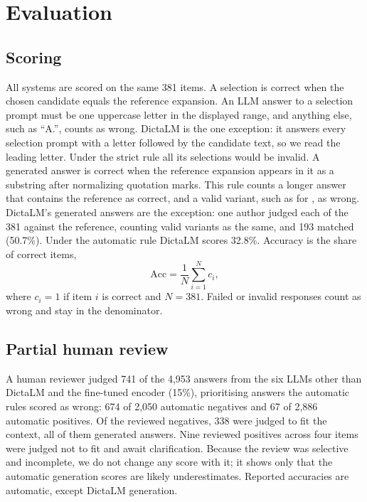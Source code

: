 \documentclass[11pt]{article}
\newcommand{\heb}[1]{\R{#1}}
\begin{document}
\section{Evaluation}
\label{sec:eval}
\subsection{Scoring}
All systems are scored on the same 381 items. A selection is correct when the chosen candidate equals the reference expansion. An LLM answer to a selection prompt must be one uppercase letter in the displayed range, and anything else, such as ``A.'', counts as wrong. DictaLM is the one exception: it answers every selection prompt with a letter followed by the candidate text, so we read the leading letter. Under the strict rule all its selections would be invalid. A generated answer is correct when the reference expansion appears in it as a substring after normalizing quotation marks. This rule counts a longer answer that contains the reference as correct, and a valid variant, such as \heb{שקלים חדשים} for \heb{שקל חדש}, as wrong. DictaLM's generated answers are the exception: one author judged each of the 381 against the reference, counting valid variants as the same, and 193 matched (50.7\%). Under the automatic rule DictaLM scores 32.8\%. Accuracy is the share of correct items,
\begin{equation}
\mathrm{Acc}=\frac{1}{N}\sum_{i=1}^{N}c_i,
\end{equation}
where $c_i=1$ if item $i$ is correct and $N=381$. Failed or invalid responses count as wrong and stay in the denominator.

\subsection{Partial human review}
A human reviewer judged 741 of the 4,953 answers from the six LLMs other than DictaLM and the fine-tuned encoder (15\%), prioritising answers the automatic rules scored as wrong: 674 of 2,050 automatic negatives and 67 of 2,886 automatic positives. Of the reviewed negatives, 338 were judged to fit the context, all of them generated answers. Nine reviewed positives across four items were judged not to fit and await clarification. Because the review was selective and incomplete, we do not change any score with it; it shows only that the automatic generation scores are likely underestimates. Reported accuracies are automatic, except DictaLM generation.
\end{document}
